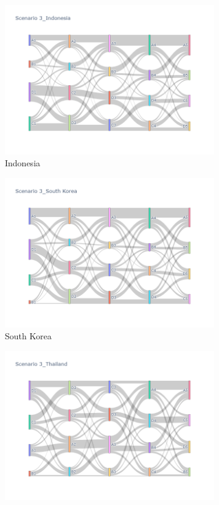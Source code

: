 \begin{figure}[h]
  \begin{subfigure}{0.5\textwidth}
    \centering
    \includegraphics[width=\textwidth]{Figure/figure32c.png}
    \caption{Indonesia}
  \end{subfigure}
  \begin{subfigure}{0.5\textwidth}
    \centering
    \includegraphics[width=\linewidth]{Figure/figure33c.png}
    \caption{South Korea}
  \end{subfigure}
  \begin{subfigure}{0.5\textwidth}
    \centering
    \includegraphics[width=\linewidth]{Figure/figure34c.png}

\end{subfigure}
\end{figure}
